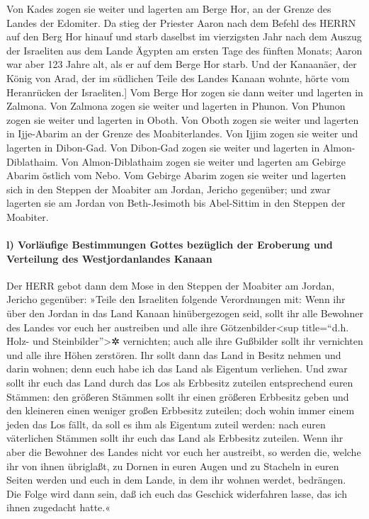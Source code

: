 Von Kades zogen sie weiter und lagerten am Berge Hor, an
der Grenze des Landes der Edomiter. Da stieg der Priester
Aaron nach dem Befehl des HERRN auf den Berg Hor hinauf und starb
daselbst im vierzigsten Jahr nach dem Auszug der Israeliten aus dem
Lande Ägypten am ersten Tage des fünften Monats; Aaron
war aber 123 Jahre alt, als er auf dem Berge Hor starb.
\bibleverse{40}{[}Und der Kanaanäer, der König von Arad, der im
südlichen Teile des Landes Kanaan wohnte, hörte vom Heranrücken der
Israeliten.{]} Vom Berge Hor zogen sie dann weiter und
lagerten in Zalmona. Von Zalmona zogen sie weiter und
lagerten in Phunon. Von Phunon zogen sie weiter und
lagerten in Oboth. Von Oboth zogen sie weiter und
lagerten in Ijje-Abarim an der Grenze des Moabiterlandes.
Von Ijjim zogen sie weiter und lagerten in Dibon-Gad.
Von Dibon-Gad zogen sie weiter und lagerten in
Almon-Diblathaim. Von Almon-Diblathaim zogen sie weiter
und lagerten am Gebirge Abarim östlich vom Nebo. Vom
Gebirge Abarim zogen sie weiter und lagerten sich in den Steppen der
Moabiter am Jordan, Jericho gegenüber; und zwar lagerten
sie am Jordan von Beth-Jesimoth bis Abel-Sittim in den Steppen der
Moabiter.

\hypertarget{l-vorluxe4ufige-bestimmungen-gottes-bezuxfcglich-der-eroberung-und-verteilung-des-westjordanlandes-kanaan}{%
\paragraph{l) Vorläufige Bestimmungen Gottes bezüglich der Eroberung und
Verteilung des Westjordanlandes
Kanaan}\label{l-vorluxe4ufige-bestimmungen-gottes-bezuxfcglich-der-eroberung-und-verteilung-des-westjordanlandes-kanaan}}

Der HERR gebot dann dem Mose in den Steppen der Moabiter
am Jordan, Jericho gegenüber: »Teile den Israeliten folgende
Verordnungen mit: Wenn ihr über den Jordan in das Land
Kanaan hinübergezogen seid, sollt ihr alle Bewohner des
Landes vor euch her austreiben und alle ihre Götzenbilder\textless sup
title=``d.h. Holz- und Steinbilder''\textgreater✲ vernichten; auch alle
ihre Gußbilder sollt ihr vernichten und alle ihre Höhen zerstören.
Ihr sollt dann das Land in Besitz nehmen und darin
wohnen; denn euch habe ich das Land als Eigentum verliehen.
Und zwar sollt ihr euch das Land durch das Los als
Erbbesitz zuteilen entsprechend euren Stämmen: den größeren Stämmen
sollt ihr einen größeren Erbbesitz geben und den kleineren einen weniger
großen Erbbesitz zuteilen; doch wohin immer einem jeden das Los fällt,
da soll es ihm als Eigentum zuteil werden: nach euren väterlichen
Stämmen sollt ihr euch das Land als Erbbesitz zuteilen.
Wenn ihr aber die Bewohner des Landes nicht vor euch her
austreibt, so werden die, welche ihr von ihnen übriglaßt, zu Dornen in
euren Augen und zu Stacheln in euren Seiten werden und euch in dem
Lande, in dem ihr wohnen werdet, bedrängen. Die Folge
wird dann sein, daß ich euch das Geschick widerfahren lasse, das ich
ihnen zugedacht hatte.«

